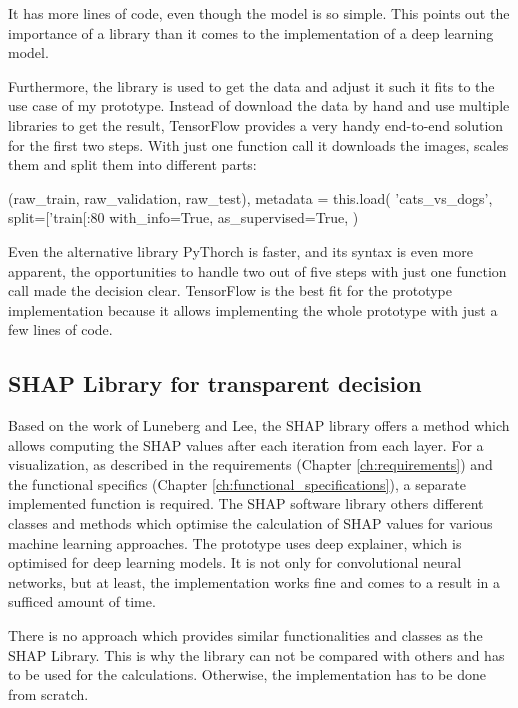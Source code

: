 It has more lines of code, even though the model is so simple. This points out the importance of a library than it comes to the implementation of a deep learning model.

Furthermore, the library is used to get the data and adjust it such it fits to the use case of my prototype. Instead of download the data by hand and use multiple libraries to get the result, TensorFlow provides a very handy end-to-end solution for the first two steps. With just one function call it downloads the images, scales them and split them into different parts:

\begin{python}[label={pred}, caption={Predictions of the pre-trained VGG16 Architecture CNN model}]
	(raw_train, raw_validation, raw_test), metadata = this.load(
	'cats_vs_dogs',
	split=['train[:80%
	with_info=True,
	as_supervised=True,
	)
\end{python}

Even the alternative library PyThorch is faster, and its syntax is even more apparent, the opportunities to handle two out of five steps with just one function call made the decision clear. TensorFlow is the best fit for the prototype implementation because it allows implementing the whole prototype with just a few lines of code. 

\subsection{SHAP Library for transparent decision}

Based on the work of Luneberg and Lee, the SHAP library offers a method which allows computing the SHAP values after each iteration from each layer.  For a visualization, as described in the requirements (Chapter \ref{ch:requirements}) and the functional specifics (Chapter \ref{ch:functional_specifications}), a separate implemented function is required. The SHAP software library others different classes and methods which optimise the calculation of SHAP values for various machine learning approaches. The prototype uses deep explainer, which is optimised for deep learning models. It is not only for convolutional neural networks, but at least, the implementation works fine and comes to a result in a sufficed amount of time. 

There is no approach which provides similar functionalities and classes as the SHAP Library. This is why the library can not be compared with others and has to be used for the calculations. Otherwise, the implementation has to be done from scratch. 

